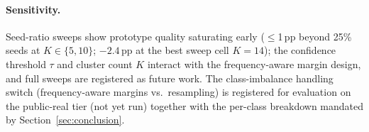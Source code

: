 \paragraph{Sensitivity.}
Seed-ratio sweeps show prototype quality saturating early ($\leq$1\,pp beyond 25\% seeds at $K\in\{5,10\}$; $-2.4$\,pp at the best sweep cell $K{=}14$); the confidence threshold $\tau$ and cluster count $K$ interact with the frequency-aware margin design, and full sweeps are registered as future work. The class-imbalance handling switch (frequency-aware margins vs.\ resampling) is registered for evaluation on the public-real tier (not yet run) together with the per-class breakdown mandated by Section~\ref{sec:conclusion}.
